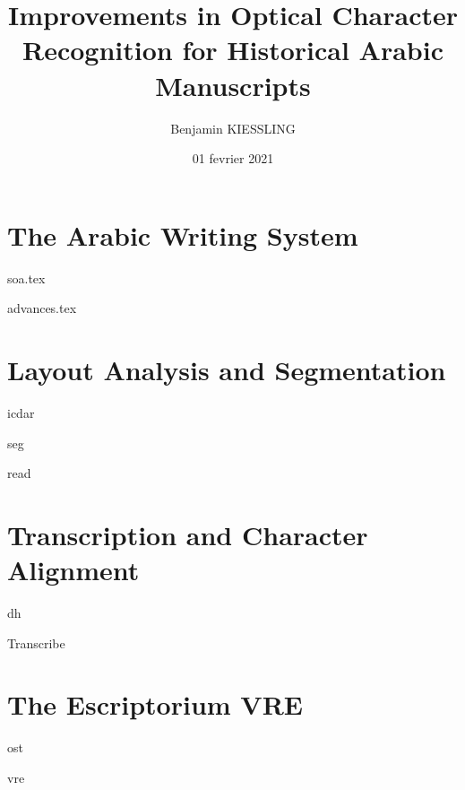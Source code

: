\documentclass[a4paper, 12pt]{book}
\title{Improvements in Optical Character Recognition for Historical Arabic Manuscripts}
\author{Benjamin KIESSLING}
\institute{l'École Pratique des Hautes Études}
\date{01 fevrier 2021}
\begin{document}
\pslcover

\frontmatter

\cleardoublepage

\cleardoublepage


\tableofcontents
\listoffigures
\listoftables

\mainmatter

\cleardoublepage
\part{The Arabic Writing System}

\begin{refsection}
{soa.tex}
\printbibliography[heading=subbibliography]
\end{refsection}
\begin{refsection}
{advances.tex}
\printbibliography[heading=subbibliography]
\end{refsection}
\part{Layout Analysis and Segmentation}
\label{part:la}
\begin{refsection}
{icdar}
\printbibliography[heading=subbibliography]
\end{refsection}
\begin{refsection}
{seg}
\printbibliography[heading=subbibliography]
\end{refsection}
\cleardoublepage
\begin{refsection}
{read}
\printbibliography[heading=subbibliography]
\end{refsection}

\part{Transcription and Character Alignment}
\cleardoublepage
\begin{refsection}
{dh}
\printbibliography[heading=subbibliography]
\end{refsection}
\begin{refsection}
{Transcribe}
\printbibliography[heading=subbibliography]
\end{refsection}

\part{The Escriptorium VRE}
\cleardoublepage
\begin{refsection}
{ost}
\printbibliography[heading=subbibliography]
\end{refsection}
\begin{refsection}
{vre}
\printbibliography[heading=subbibliography]
\end{refsection}

\begin{appendices}

\end{appendices}
\end{document}
